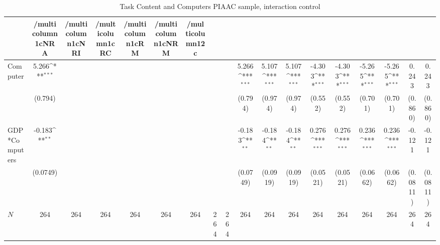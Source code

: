 \begin{table}[htbp]\centering
\def\sym#1{\ifmmode^{#1}\else\(^{#1}\)\fi}
\caption{Task Content and Computers PIAAC sample, interaction control }
\begin{tabular}{l*{17}{c}}
\hline\hline
            &/multicolumn{1}{c}{NRA}&/multicolumn{1}{c}{NRI}&/multicolumn{1}{c}{RC}&/multicolumn{1}{c}{RM}&/multicolumn{1}{c}{NRM}&/multicolumn{12}{c}{}                                                                                                                                                                                                                                                  \\
\hline
Computer    &       5.266\sym{***}&                     &                     &                     &                     &                     &                     &                     &       5.266\sym{***}&       5.107\sym{***}&       5.107\sym{***}&      -4.303\sym{***}&      -4.303\sym{***}&      -5.265\sym{***}&      -5.265\sym{***}&       0.243         &       0.243         \\
            &     (0.794)         &                     &                     &                     &                     &                     &                     &                     &     (0.794)         &     (0.974)         &     (0.974)         &     (0.552)         &     (0.552)         &     (0.701)         &     (0.701)         &     (0.860)         &     (0.860)         \\
[1em]
GDP*Computers&      -0.183\sym{**} &                     &                     &                     &                     &                     &                     &                     &      -0.183\sym{**} &      -0.184\sym{**} &      -0.184\sym{**} &       0.276\sym{***}&       0.276\sym{***}&       0.236\sym{***}&       0.236\sym{***}&      -0.121         &      -0.121         \\
            &    (0.0749)         &                     &                     &                     &                     &                     &                     &                     &    (0.0749)         &    (0.0919)         &    (0.0919)         &    (0.0521)         &    (0.0521)         &    (0.0662)         &    (0.0662)         &    (0.0811)         &    (0.0811)         \\
\hline
\(N\)       &         264         &         264         &         264         &         264         &         264         &         264         &         264         &         264         &         264         &         264         &         264         &         264         &         264         &         264         &         264         &         264         &         264         \\

\end{tabular}
\end{table}
